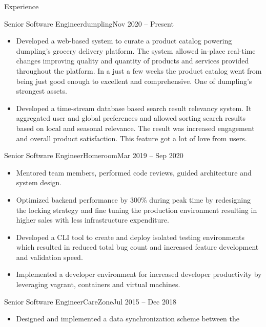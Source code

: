 \documentclass{mcdowellcv}
\begin{document}
\begin{cvsection}{Experience}
	\begin{cvsubsection}{Senior Software Engineer}{dumpling}{Nov 2020 -- Present}
		\begin{itemize}
    \item Developed a web-based system to curate a product catalog powering dumpling's
      grocery delivery platform. The system allowed in-place real-time changes
      improving quality and quantity of products and services provided
      throughout the platform. In a just a few weeks the product catalog went
      from being just good enough to excellent and comprehensive. One of
      dumpling's strongest assets.
    \item Developed a time-stream database based search result relevancy
      system. It aggregated user and global preferences and allowed sorting
      search results based on local and seasonal relevance. The result was
      increased engagement and overall product satisfaction. This feature got a
      lot of love from users.
		\end{itemize}
	\end{cvsubsection}
	\begin{cvsubsection}{Senior Software Engineer}{Homeroom}{Mar 2019 -- Sep 2020}
		\begin{itemize}
    \item Mentored team members, performed code reviews, guided architecture and
      system design.
    \item Optimized backend performance by 300\% during peak time by redesigning
      the locking strategy and fine tuning the production environment resulting in
      higher sales with less infrastructure expenditure.
    \item Developed a CLI tool to create and deploy isolated testing
      environments which resulted in reduced total bug count and increased feature
      development and validation speed.
    \item Implemented a developer environment for increased developer
      productivity by leveraging vagrant, containers and virtual machines.
		\end{itemize}
	\end{cvsubsection}
	\begin{cvsubsection}{Senior Software Engineer}{CareZone}{Jul 2015 -- Dec 2018}
		\begin{itemize}
    \item Designed and implemented a data synchronization scheme between the

\end{itemize}
\end{cvsubsection}
\end{cvsection}
\end{document}
